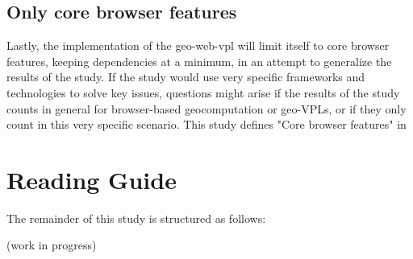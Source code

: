 \subsection*{Only core browser features}
Lastly, the implementation of the geo-web-vpl will limit itself to core browser features, keeping dependencies at a minimum, in an attempt to generalize the results of the study.
If the study would use very specific frameworks and technologies to solve key issues, questions might arise if the results of the study counts in general for browser-based geocomputation or geo-VPLs, or if they only count in this very specific scenario. 
This study defines "Core browser features" in 

\newpage
\section{Reading Guide}

The remainder of this study is structured as follows:

(work in progress)

